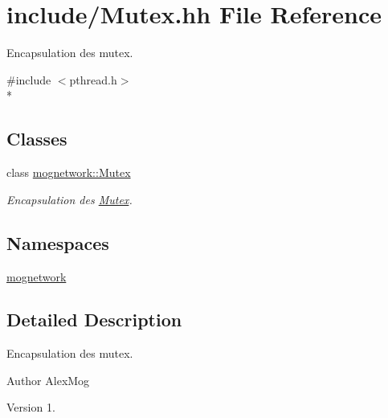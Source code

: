 \hypertarget{_mutex_8hh}{\section{include/\-Mutex.hh File Reference}
\label{_mutex_8hh}
}


Encapsulation des mutex.  


{\ttfamily \#include $<$pthread.\-h$>$}\\*
\subsection*{Classes}
\begin{DoxyCompactItemize}
\item 
class \hyperlink{classmognetwork_1_1_mutex}{mognetwork\-::\-Mutex}
\begin{DoxyCompactList}\small\item\em Encapsulation des \hyperlink{classmognetwork_1_1_mutex}{Mutex}. \end{DoxyCompactList}\end{DoxyCompactItemize}
\subsection*{Namespaces}
\begin{DoxyCompactItemize}
\item 
\hyperlink{namespacemognetwork}{mognetwork}
\end{DoxyCompactItemize}


\subsection{Detailed Description}
Encapsulation des mutex. \begin{DoxyAuthor}{Author}
Alex\-Mog 
\end{DoxyAuthor}
\begin{DoxyVersion}{Version}
1. 
\end{DoxyVersion}

